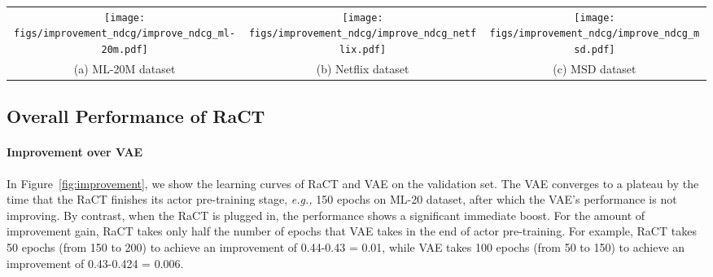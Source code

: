 \documentclass{article} \usepackage{iclr2020_conference,times}
\newcommand{\eg}[0]{\emph{e.g., }}
\begin{document}
\begin{figure*}[t!]\vspace{-0mm}\centering
	\begin{tabular}{c c c}		
		\hspace{-2mm}
		\texttt{[image: figs/improvement\_ndcg/improve\_ndcg\_ml-20m.pdf]} &
		\hspace{-4mm}
		\texttt{[image: figs/improvement\_ndcg/improve\_ndcg\_netflix.pdf]} &
		\hspace{-4mm}
		\texttt{[image: figs/improvement\_ndcg/improve\_ndcg\_msd.pdf]}	
		\vspace{-2mm}
		\\
		(a) ML-20M dataset \vspace{-0mm}   & 
		(b) Netflix dataset \hspace{-0mm} &
		(c) MSD dataset\hspace{-0mm} \\ 
	\end{tabular}
	\vspace{-2mm}
	\caption{Performance improvement (NDCG@100) with RaCT over the VAE baseline.}
\vspace{-4mm}
	\label{fig:improvement}
\end{figure*}


\subsection{Overall Performance of RaCT}
\vspace{-2mm}


\paragraph{Improvement over VAE} 
In Figure~\ref{fig:improvement}, we show the learning curves of RaCT and VAE on the validation set. The VAE converges to a plateau by the time that the RaCT finishes its actor pre-training stage, \eg 150 epochs on ML-20 dataset, after which the VAE's performance is not improving. By contrast, when the RaCT is plugged in, the performance shows a significant immediate boost. For the amount of improvement gain, RaCT takes only half the number of epochs that VAE takes in the end of actor pre-training. For example, RaCT takes 50 epochs (from 150 to 200) to achieve an improvement of 0.44-0.43 = 0.01, while VAE takes 100 epochs (from 50 to 150) to achieve an improvement of 0.43-0.424 = 0.006.
\end{document}
